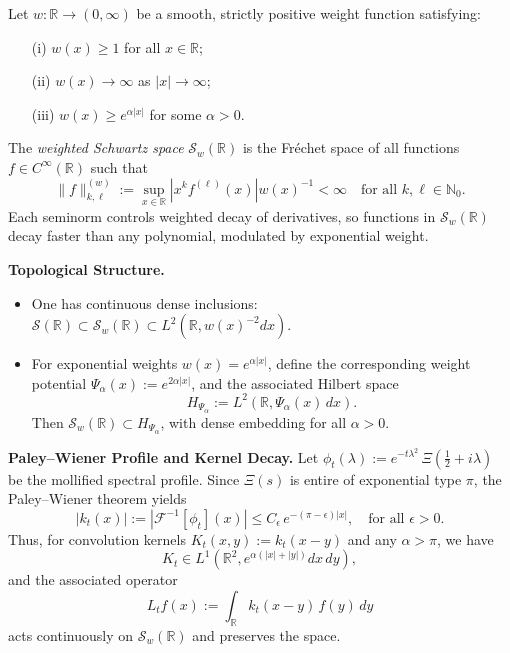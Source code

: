 \begin{definition}\label{def:weighted-schwartz-space}
Let \( w \colon \mathbb{R} \to (0, \infty) \) be a smooth, strictly positive weight function satisfying:
\begin{enumerate}
    \item[\textup{(i)}] \( w(x) \ge 1 \) for all \( x \in \mathbb{R} \);
    \item[\textup{(ii)}] \( w(x) \to \infty \) as \( |x| \to \infty \);
    \item[\textup{(iii)}] \( w(x) \ge e^{\alpha |x|} \) for some \( \alpha > 0 \).
\end{enumerate}

The \emph{weighted Schwartz space} \( \mathcal{S}_w(\mathbb{R}) \) is the Fréchet space of all functions \( f \in C^\infty(\mathbb{R}) \) such that
\[
\| f \|^{(w)}_{k,\ell} := \sup_{x \in \mathbb{R}} \left| x^k f^{(\ell)}(x) \right| w(x)^{-1} < \infty \quad \text{for all } k,\ell \in \mathbb{N}_0.
\]
Each seminorm controls weighted decay of derivatives, so functions in \( \mathcal{S}_w(\mathbb{R}) \) decay faster than any polynomial, modulated by exponential weight.

\medskip
\noindent\textbf{Topological Structure.}
\begin{itemize}
    \item One has continuous dense inclusions: \( \mathcal{S}(\mathbb{R}) \subset \mathcal{S}_w(\mathbb{R}) \subset L^2(\mathbb{R}, w(x)^{-2} dx) \).

    \item For exponential weights \( w(x) = e^{\alpha |x|} \), define the corresponding weight potential \( \Psi_\alpha(x) := e^{2\alpha |x|} \), and the associated Hilbert space
    \[
    H_{\Psi_\alpha} := L^2(\mathbb{R}, \Psi_\alpha(x)\, dx).
    \]
    Then \( \mathcal{S}_w(\mathbb{R}) \subset H_{\Psi_\alpha} \), with dense embedding for all \( \alpha > 0 \).
\end{itemize}

\medskip
\noindent\textbf{Paley–Wiener Profile and Kernel Decay.}
Let \( \phi_t(\lambda) := e^{-t\lambda^2} \, \Xi\left( \tfrac{1}{2} + i\lambda \right) \) be the mollified spectral profile. Since \( \Xi(s) \) is entire of exponential type \( \pi \), the Paley–Wiener theorem yields
\[
|k_t(x)| := \left| \mathcal{F}^{-1}[\phi_t](x) \right| \le C_\epsilon \, e^{-(\pi - \epsilon)|x|}, \quad \text{for all } \epsilon > 0.
\]
Thus, for convolution kernels \( K_t(x,y) := k_t(x - y) \) and any \( \alpha > \pi \), we have
\[
K_t \in L^1(\mathbb{R}^2, e^{\alpha(|x| + |y|)} dx\,dy),
\]
and the associated operator
\[
L_t f(x) := \int_{\mathbb{R}} k_t(x - y)\, f(y)\, dy
\]
acts continuously on \( \mathcal{S}_w(\mathbb{R}) \) and preserves the space.


\end{definition}
